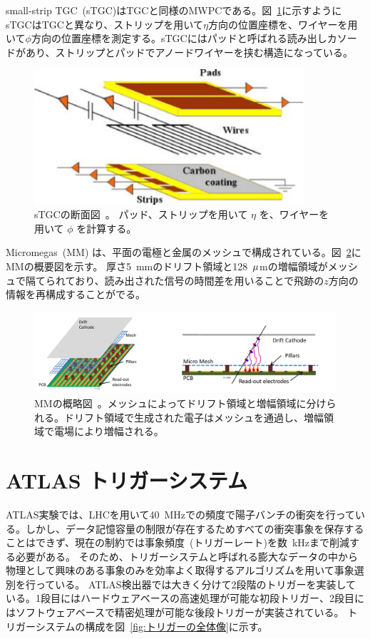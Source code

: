 small-strip TGC~(sTGC)はTGCと同様のMWPCである。図~\ref{fig:sTGC}に示すようにsTGCはTGCと異なり、ストリップを用いて$\eta$方向の位置座標を、ワイヤーを用いて$\phi$方向の位置座標を測定する。sTGCにはパッドと呼ばれる読み出しカソードがあり、ストリップとパッドでアノードワイヤーを挟む構造になっている。

\begin{figure}[tb]
  \centering
  \includegraphics[clip, width=10cm]{fig/2/stgc-structure.pdf}
  \caption{sTGCの断面図~\cite{article:NSW_tech}。 パッド、ストリップを用いて $\eta$ を、ワイヤーを用いて $\phi$ を計算する。}
  \label{fig:sTGC}
\end{figure}

Micromegas~(MM) は、平面の電極と金属のメッシュで構成されている。図~\ref{fig:MM}にMMの概要図を示す。
厚さ5~mmのドリフト領域と128~$\rm{\mu}$mの増幅領域がメッシュで隔てられており、読み出された信号の時間差を用いることで飛跡の$z$方向の情報を再構成することがでる。

\begin{figure}[tb]
  \centering
  \includegraphics[clip, width=15cm]{fig/2/mm-structure.pdf}
  \caption{MMの概略図~\cite{article:NSW_tech}。メッシュによってドリフト領域と増幅領域に分けられる。ドリフト領域で生成された電子はメッシュを通過し、増幅領域で電場により増幅される。}
  \label{fig:MM}
\end{figure}


\newpage
\section{ATLAS トリガーシステム}
ATLAS実験では、LHCを用いて40~MHzでの頻度で陽子バンチの衝突を行っている。しかし、データ記憶容量の制限が存在するためすべての衝突事象を保存することはできず、現在の制約では事象頻度~(トリガーレート)を数~kHzまで削減する必要がある。
そのため、トリガーシステムと呼ばれる膨大なデータの中から物理として興味のある事象のみを効率よく取得するアルゴリズムを用いて事象選別を行っている。
ATLAS検出器では大きく分けて2段階のトリガーを実装している。1段目にはハードウェアベースの高速処理が可能な初段トリガー、2段目にはソフトウェアベースで精密処理が可能な後段トリガーが実装されている。
トリガーシステムの構成を図~\ref{fig:トリガーの全体像}に示す。

